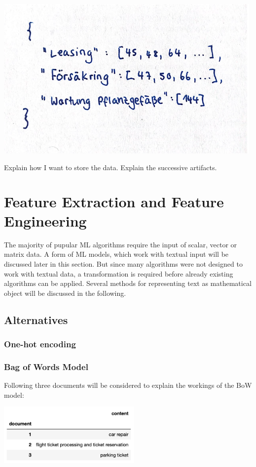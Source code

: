 		\includegraphics[height=8cm]{Bilder/description_map.png}

Explain how I want to store the data. Explain the successive artifacts.

        
        \section{Feature Extraction and Feature Engineering}
        The majority of pupular ML algorithms require the input of scalar, vector or matrix data. A form of ML models, which work with textual input will be discussed later in this section. 
        But since many algorithms were not designed to work with textual data, a transformation is required before already existing algorithms can be applied. Several methods for representing text as mathematical object will be discussed in the following.
    
            \subsection{Alternatives}
            \subsubsection{One-hot encoding}
            
    
            \subsubsection{Bag of Words Model}
            Following three documents will be considered to explain the workings of the \ac{BoW} model:
    
            \includegraphics[height=3cm]{Bilder/corpus_bow.png}
            
